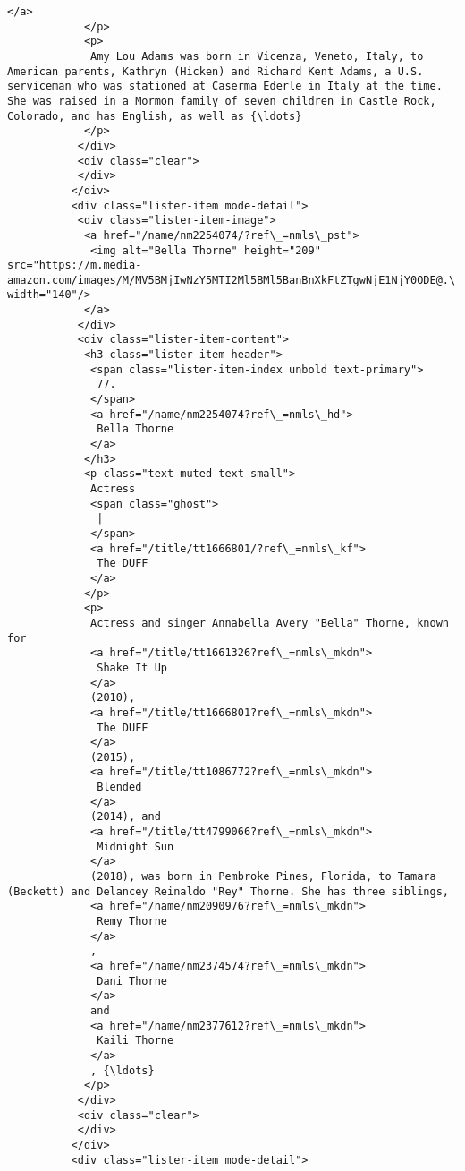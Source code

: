 \documentclass[11pt]{article}
\begin{document}
\begin{Verbatim}[commandchars=\\\{\}]
             </a>
            </p>
            <p>
             Amy Lou Adams was born in Vicenza, Veneto, Italy, to American parents, Kathryn (Hicken) and Richard Kent Adams, a U.S. serviceman who was stationed at Caserma Ederle in Italy at the time. She was raised in a Mormon family of seven children in Castle Rock, Colorado, and has English, as well as {\ldots}
            </p>
           </div>
           <div class="clear">
           </div>
          </div>
          <div class="lister-item mode-detail">
           <div class="lister-item-image">
            <a href="/name/nm2254074/?ref\_=nmls\_pst">
             <img alt="Bella Thorne" height="209" src="https://m.media-amazon.com/images/M/MV5BMjIwNzY5MTI2Ml5BMl5BanBnXkFtZTgwNjE1NjY0ODE@.\_V1\_UY209\_CR12,0,140,209\_AL\_.jpg" width="140"/>
            </a>
           </div>
           <div class="lister-item-content">
            <h3 class="lister-item-header">
             <span class="lister-item-index unbold text-primary">
              77.
             </span>
             <a href="/name/nm2254074?ref\_=nmls\_hd">
              Bella Thorne
             </a>
            </h3>
            <p class="text-muted text-small">
             Actress
             <span class="ghost">
              |
             </span>
             <a href="/title/tt1666801/?ref\_=nmls\_kf">
              The DUFF
             </a>
            </p>
            <p>
             Actress and singer Annabella Avery "Bella" Thorne, known for
             <a href="/title/tt1661326?ref\_=nmls\_mkdn">
              Shake It Up
             </a>
             (2010),
             <a href="/title/tt1666801?ref\_=nmls\_mkdn">
              The DUFF
             </a>
             (2015),
             <a href="/title/tt1086772?ref\_=nmls\_mkdn">
              Blended
             </a>
             (2014), and
             <a href="/title/tt4799066?ref\_=nmls\_mkdn">
              Midnight Sun
             </a>
             (2018), was born in Pembroke Pines, Florida, to Tamara (Beckett) and Delancey Reinaldo "Rey" Thorne. She has three siblings,
             <a href="/name/nm2090976?ref\_=nmls\_mkdn">
              Remy Thorne
             </a>
             ,
             <a href="/name/nm2374574?ref\_=nmls\_mkdn">
              Dani Thorne
             </a>
             and
             <a href="/name/nm2377612?ref\_=nmls\_mkdn">
              Kaili Thorne
             </a>
             , {\ldots}
            </p>
           </div>
           <div class="clear">
           </div>
          </div>
          <div class="lister-item mode-detail">

\end{Verbatim}
\end{document}
